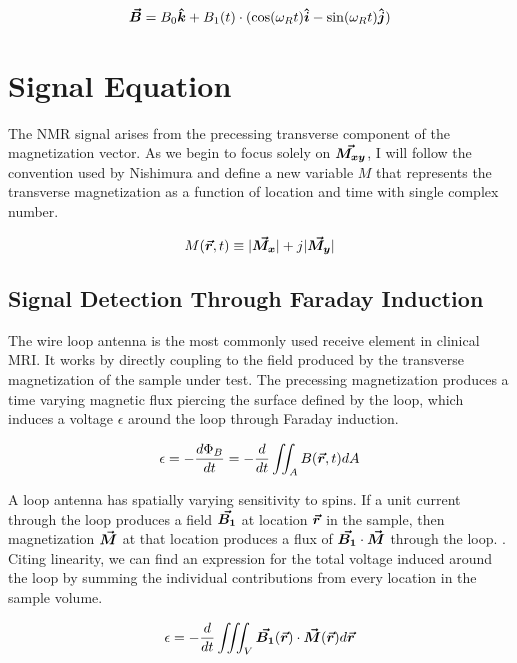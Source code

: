 \begin{equation}\label{eq:B_rot}
    \bm{\vec{B}} = B_0 \bm{\hat{k}} + B_1(t) \cdot (\cos(\omega_R t) \bm{\hat{i}} - \sin(\omega_R t)\bm{\hat{j}})
\end{equation}

\section{Signal Equation}
The NMR signal arises from the precessing transverse component of the magnetization vector. As we begin to focus solely
on $\bm{\vec{M_{xy}}}$, I will follow the convention used by Nishimura \cite{nishimura} and define a new variable $M$ that
represents the transverse magnetization as a function of location and time with single complex number.

\begin{equation}\label{eq:M_complex}
    M(\bm{\vec{r}},t) \equiv |\bm{\vec{M_x}}| + j |\bm{\vec{M_y}}|
\end{equation}

\subsection{Signal Detection Through Faraday Induction}
The wire loop antenna is the most commonly used receive element in clinical MRI. It works by directly coupling to the
field produced by the transverse magnetization of the sample under test. The precessing magnetization produces a time
varying magnetic flux piercing the surface defined by the loop, which induces a voltage $\epsilon$ around the loop
through Faraday induction.

\begin{equation}\label{eq:faraday_induction}
    \epsilon = - \frac{d \Phi_B}{dt} = -\frac{d}{dt} \iint_A B(\bm{\vec{r}},t) dA
\end{equation}

A loop antenna has spatially varying sensitivity to spins. If a unit current through the loop produces a field
$\bm{\vec{B_1}}$ at location $\bm{\vec{r}}$ in the sample, then magnetization $\bm{\vec{M}}$ at that location produces a flux of
$\bm{\vec{B_1}} \cdot \bm{\vec{M}}$ through the loop.  \cite{Hoult1979}. Citing linearity, we can find an expression for the
total voltage induced around the loop by summing the individual contributions from every location in the sample volume.

\begin{equation}\label{eq:reciprocity}
    \epsilon = -\frac{d}{dt} \iiint_V \bm{\vec{B_1}}(\bm{\vec{r}}) \cdot \bm{\vec{M}}(\bm{\vec{r}}) d\bm{\vec{r}}
\end{equation}

